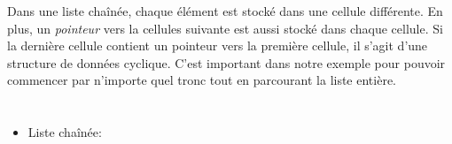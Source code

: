 {{Dans une liste chaînée, chaque élément est stocké dans une cellule différente. En plus, un \emph{pointeur} vers la cellules suivante est aussi stocké dans chaque cellule. Si la dernière cellule contient un pointeur vers la première cellule, il s’agit d’une structure de données cyclique. C’est important dans notre exemple pour pouvoir commencer par n’importe quel tronc tout en parcourant la liste entière.



\section*{\BrochureWebsitesAndKeywords}
{\raggedright
\begin{itemize}
  \item Liste chaînée: \href{https://fr.wikipedia.org/wiki/Liste_cha\%C3\%AEn\%C3\%A9e}{}
\end{itemize}


}

}{}

\def\AuthorDagieneV{} %
\def\AuthorKinciusV{} %
\def\AuthorPohlW{} %
\def\AuthorBaumannL{} %
\def\AuthorSchluterK{} %
\def\AuthorDatzkoThutS{} %
\def\AuthorPelletE{} %

\newpage}{}
